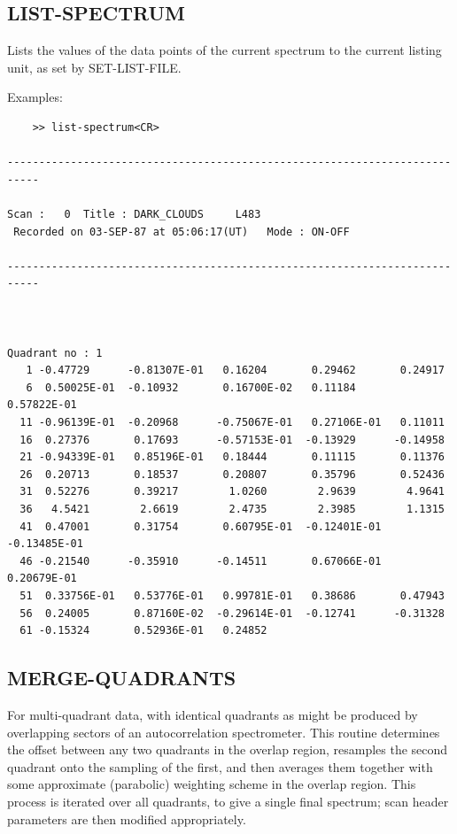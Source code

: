 \documentclass[11pt,twoside]{report}
\begin{document}
\subsection{LIST-SPECTRUM} 

Lists the values of the data points of the current spectrum to the current
listing unit, as set by SET-LIST-FILE.

Examples:
\begin{verbatim}
    >> list-spectrum<CR>

---------------------------------------------------------------------------

Scan :   0  Title : DARK_CLOUDS     L483
 Recorded on 03-SEP-87 at 05:06:17(UT)   Mode : ON-OFF

---------------------------------------------------------------------------



Quadrant no : 1
   1 -0.47729      -0.81307E-01   0.16204       0.29462       0.24917
   6  0.50025E-01  -0.10932       0.16700E-02   0.11184       0.57822E-01
  11 -0.96139E-01  -0.20968      -0.75067E-01   0.27106E-01   0.11011
  16  0.27376       0.17693      -0.57153E-01  -0.13929      -0.14958
  21 -0.94339E-01   0.85196E-01   0.18444       0.11115       0.11376
  26  0.20713       0.18537       0.20807       0.35796       0.52436
  31  0.52276       0.39217        1.0260        2.9639        4.9641
  36   4.5421        2.6619        2.4735        2.3985        1.1315
  41  0.47001       0.31754       0.60795E-01  -0.12401E-01  -0.13485E-01
  46 -0.21540      -0.35910      -0.14511       0.67066E-01   0.20679E-01
  51  0.33756E-01   0.53776E-01   0.99781E-01   0.38686       0.47943
  56  0.24005       0.87160E-02  -0.29614E-01  -0.12741      -0.31328
  61 -0.15324       0.52936E-01   0.24852
\end{verbatim}

\subsection{MERGE-QUADRANTS} 

For multi-quadrant data, with identical quadrants as might be produced by
overlapping sectors of an autocorrelation spectrometer. This routine determines the
offset between any two quadrants in the overlap region, resamples the
second quadrant onto the sampling of the first, and then averages them
together with some approximate (parabolic) weighting scheme in the overlap
region. This process is iterated over all quadrants, to give a single final
spectrum; scan header parameters are then modified appropriately.
\end{document}
